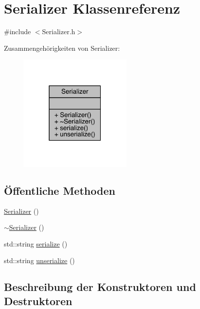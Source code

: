 \hypertarget{class_serializer}{}\section{Serializer Klassenreferenz}
\label{class_serializer}


{\ttfamily \#include $<$Serializer.\+h$>$}



Zusammengehörigkeiten von Serializer\+:\nopagebreak
\begin{figure}[H]
\begin{center}
\leavevmode
\includegraphics[width=159pt]{class_serializer__coll__graph}
\end{center}
\end{figure}
\subsection*{Öffentliche Methoden}
\begin{DoxyCompactItemize}
\item 
\hyperlink{class_serializer_a9fe7f31924098f75278d059f8443fd5b}{Serializer} ()
\item 
\hyperlink{class_serializer_a42a7d2d8e622ad1ef5f869813b498aa9}{$\sim$\+Serializer} ()
\item 
std\+::string \hyperlink{class_serializer_a76490c3d7c31f10cd2c991731fd54ac5}{serialize} ()
\item 
std\+::string \hyperlink{class_serializer_a55d2d0ca552d5a14b316bab0d8f1590a}{unserialize} ()
\end{DoxyCompactItemize}


\subsection{Beschreibung der Konstruktoren und Destruktoren}
\hypertarget{class_serializer_a9fe7f31924098f75278d059f8443fd5b}{}\label{class_serializer_a9fe7f31924098f75278d059f8443fd5b} 
